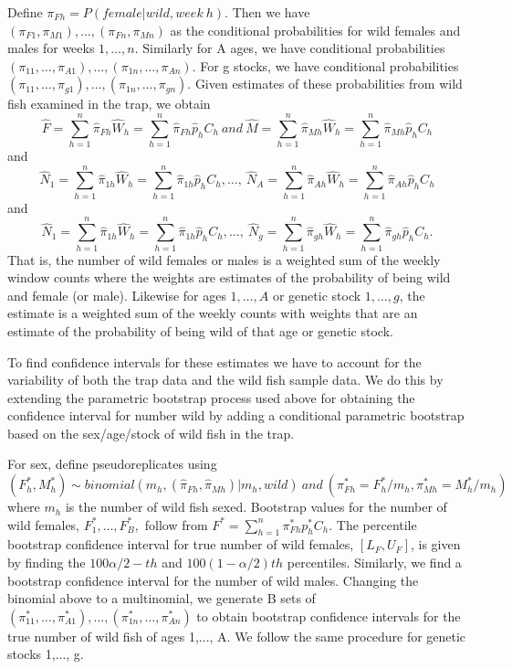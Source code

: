\documentclass[11pt]{article}
\begin{document}
Define \(\pi_{Fh} = P(female|wild,week \: h)\).  Then we have \((\pi_{F1},\pi_{M1}),\ldots,(\pi_{Fn},\pi_{Mn})\) as the conditional probabilities for wild females and males for weeks \(1,\ldots,n\).  Similarly for A ages, we have conditional probabilities \((\pi_{11}, \ldots, \pi_{A1}), \ldots,(\pi_{1n}, \ldots, \pi_{An})\). For g stocks, we have conditional probabilities \((\pi_{11}, \ldots, \pi_{g1}), \ldots,(\pi_{1n}, \ldots, \pi_{gn})\). Given estimates of these probabilities from wild fish examined in the trap, we obtain  
\[\hat{F} =\sum\limits_{h=1}^{n}\hat{\pi}_{Fh}\hat{W}_h = \sum\limits_{h=1}^{n}\hat{\pi}_{Fh}\hat{p}_{h}C_h \ and   \ \hat{M} =\sum\limits_{h=1}^{n}\hat{\pi}_{Mh}\hat{W}_h = \sum\limits_{h=1}^{n}\hat{\pi}_{Mh}\hat{p}_{h}C_h \]
and
\[\hat{N}_1 =\sum\limits_{h=1}^{n}\hat{\pi}_{1h}\hat{W}_h = \sum\limits_{h=1}^{n}\hat{\pi}_{1h}\hat{p}_{h}C_h, \ldots, \ \hat{N}_A =\sum\limits_{h=1}^{n}\hat{\pi}_{Ah}\hat{W}_h = \sum\limits_{h=1}^{n}\hat{\pi}_{Ah}\hat{p}_{h}C_{h}\]
and
\[\hat{N}_1 =\sum\limits_{h=1}^{n}\hat{\pi}_{1h}\hat{W}_h = \sum\limits_{h=1}^{n}\hat{\pi}_{1h}\hat{p}_{h}C_h, \ldots, \ \hat{N}_g =\sum\limits_{h=1}^{n}\hat{\pi}_{gh}\hat{W}_h = \sum\limits_{h=1}^{n}\hat{\pi}_{gh}\hat{p}_{h}C_{h}.\]
That is, the number of wild females or males is a weighted sum of the weekly window counts where the weights are estimates of the probability of being wild and female (or male).  Likewise for ages \(1, \ldots, A\) or genetic stock \(1, \ldots, g\), the estimate is a weighted sum of the weekly counts with weights that are an estimate of the probability of being wild of that age or genetic stock.

To find confidence intervals for these estimates we have to account for the variability of both the trap data and the wild fish sample data.  We do this by extending the parametric bootstrap process used above for obtaining the confidence interval for number wild by adding a conditional parametric bootstrap based on the sex/age/stock of wild fish in the trap.

For sex, define pseudoreplicates using
\[(F^*_h,M^*_h) \sim binomial(m_h,(\hat{\pi}_{Fh},\hat{\pi}_{Mh})|m_h, wild) \ and \ (\pi^*_{Fh}=F^*_h/m_h,\pi^*_{Mh}=M^*_h/m_h) \]	  
where \(m_h\)  is the number of wild fish sexed.  Bootstrap values for the number of wild females, \(F^*_1,\ldots, F^*_B, \) follow from \(F^*=\sum\limits_{h=1}^{n}\pi^*_{Fh} p^*_{h}C_h \).    The percentile bootstrap confidence interval for true number of wild females, \([L_F,U_F]\), is given by finding the \(100 \alpha/2-th\) and \(100(1-\alpha/2)th\) percentiles.  Similarly, we find a bootstrap confidence interval for the number of wild males.   Changing the binomial above to a multinomial, we generate B sets of \((\pi^*_{11}, \ldots, \pi^*_{A1}), \ldots,(\pi^*_{1n}, \ldots, \pi^*_{An})\) to obtain bootstrap confidence intervals for the true number of wild fish of ages 1,..., A. We follow the same procedure for genetic stocks 1,..., g.
\end{document}
